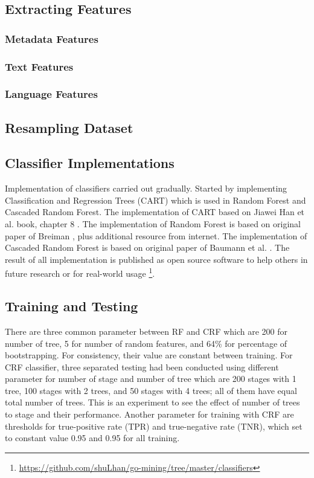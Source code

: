 \subsection{Extracting Features}
	

\subsubsection{Metadata Features}
	

\subsubsection{Text Features}
	

\subsubsection{Language Features}
	

\subsection{Resampling Dataset}
	


\subsection{Classifier Implementations}

Implementation of classifiers carried out gradually.
Started by implementing Classification and Regression Trees (CART)
\cite{breiman1984classification}
which is used in Random Forest and Cascaded Random Forest.
The implementation of CART based on Jiawei Han et al. book, chapter 8
\cite{han2011data}.
The implementation of Random Forest is based on original paper of Breiman
\cite{breiman2001random}, plus additional resource from internet.
The implementation of Cascaded Random Forest is based on original paper of
Baumann et al.
\cite{baumann2013cascaded}.
The result of all implementation is published as open source software to help
others in future research or for real-world usage \footnote{\url{https://github.com/shuLhan/go-mining/tree/master/classifiers}}.


\subsection{Training and Testing}

There are three common parameter between RF and CRF which are 200 for number of
tree, 5 for number of random features, and 64\% for percentage of
bootstrapping.
For consistency, their value are constant between training.
For CRF classifier, three separated testing had been conducted using different
parameter for number of stage and number of tree which are 200 stages with 1
tree, 100 stages with 2 trees, and 50 stages with 4 trees; all of them have
equal total number of trees.
This is an experiment to see the effect of number of trees to stage and their
performance.
Another parameter for training with CRF are thresholds for true-positive rate
(TPR) and true-negative rate (TNR), which set to constant value 0.95 and 0.95
for all training.


